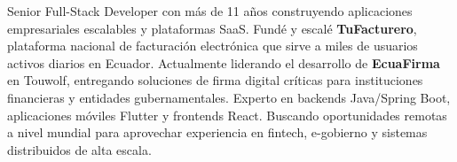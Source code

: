 
\begin{cvparagraph}

Senior Full-Stack Developer con más de 11 años construyendo aplicaciones empresariales escalables y plataformas SaaS. Fundé y escalé \textbf{TuFacturero}, plataforma nacional de facturación electrónica que sirve a miles de usuarios activos diarios en Ecuador. Actualmente liderando el desarrollo de \textbf{EcuaFirma} en Touwolf, entregando soluciones de firma digital críticas para instituciones financieras y entidades gubernamentales. Experto en backends Java/Spring Boot, aplicaciones móviles Flutter y frontends React. Buscando oportunidades remotas a nivel mundial para aprovechar experiencia en fintech, e-gobierno y sistemas distribuidos de alta escala.
\end{cvparagraph}

